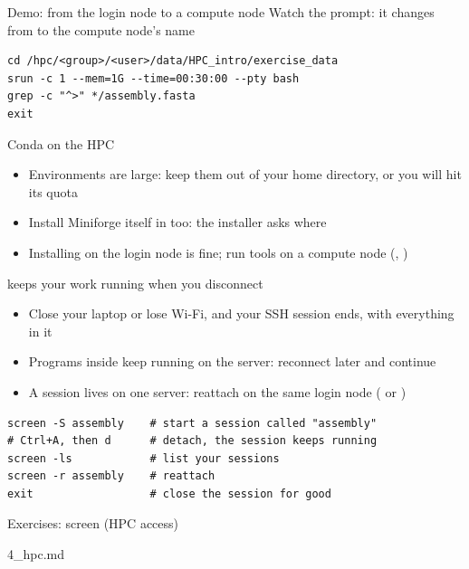 \begin{frame}[fragile]{Demo: from the login node to a compute node}
Watch the prompt: it changes from  to the compute node's name
\begin{lstlisting}
cd /hpc/<group>/<user>/data/HPC_intro/exercise_data
srun -c 1 --mem=1G --time=00:30:00 --pty bash
grep -c "^>" */assembly.fasta
exit
\end{lstlisting}
\end{frame}

\begin{frame}[fragile]{Conda on the HPC}
\begin{itemize}
    \item Environments are large: keep them out of your home directory, or you will hit its quota
    \item Install Miniforge itself in  too: the installer asks where
    \item Installing on the login node is fine; run tools on a compute node (, )
\end{itemize}
\end{frame}

\begin{frame}[fragile]{ keeps your work running when you disconnect}
\small
\begin{itemize}
    \item Close your laptop or lose Wi-Fi, and your SSH session ends, with everything in it
    \item Programs inside  keep running on the server: reconnect later and continue
    \item A session lives on one server: reattach on the same login node ( or )
\end{itemize}
\begin{lstlisting}
screen -S assembly    # start a session called "assembly"
# Ctrl+A, then d      # detach, the session keeps running
screen -ls            # list your sessions
screen -r assembly    # reattach
exit                  # close the session for good
\end{lstlisting}
\end{frame}

\begin{frame}{Exercises: screen (HPC access)}
\begin{exlist}{4_hpc.md}
\end{exlist}
\end{frame}

